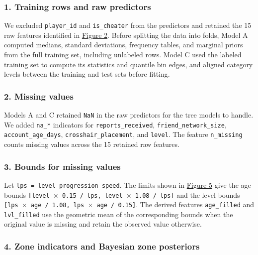 \documentclass[11pt,a4paper]{article}
\begin{document}
\subsubsection*{1. Training rows and raw predictors}

We excluded \texttt{player\_\allowbreak{}id} and \texttt{is\_\allowbreak{}cheater} from the predictors and retained the 15 raw features identified in \hyperlink{task1-figure-2}{Figure 2}. Before splitting the data into folds, Model A computed medians, standard deviations, frequency tables, and marginal priors from the full training set, including unlabeled rows. Model C used the labeled training set to compute its statistics and quantile bin edges, and aligned category levels between the training and test sets before fitting.

\subsubsection*{2. Missing values}

Models A and C retained \texttt{NaN} in the raw predictors for the tree models to handle. We added \texttt{na\_\allowbreak{}*} indicators for \texttt{reports\_\allowbreak{}received}, \texttt{friend\_\allowbreak{}network\_\allowbreak{}size}, \texttt{account\_\allowbreak{}age\_\allowbreak{}days}, \texttt{crosshair\_\allowbreak{}placement}, and \texttt{level}. The feature \texttt{n\_\allowbreak{}missing} counts missing values across the 15 retained raw features.

\subsubsection*{3. Bounds for missing values}

Let \texttt{lps = level\_\allowbreak{}progression\_\allowbreak{}speed}. The limits shown in \hyperlink{task1-figure-5}{Figure 5} give the age bounds \texttt{[level \ensuremath{\times} 0.15 / lps, level \ensuremath{\times} 1.08 / lps]} and the level bounds \texttt{[lps \ensuremath{\times} age / 1.08, lps \ensuremath{\times} age / 0.15]}. The derived features \texttt{age\_\allowbreak{}filled} and \texttt{lvl\_\allowbreak{}filled} use the geometric mean of the corresponding bounds when the original value is missing and retain the observed value otherwise.

\subsubsection*{4. Zone indicators and Bayesian zone posteriors}
\end{document}
